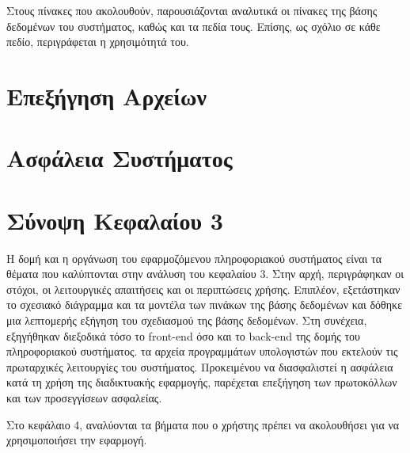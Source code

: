 Στους πίνακες που ακολουθούν, παρουσιάζονται αναλυτικά οι πίνακες της βάσης δεδομένων του συστήματος, καθώς και τα πεδία τους. Επίσης, ως σχόλιο σε κάθε πεδίο, περιγράφεται η χρησιμότητά του.

\FloatBarrier

\FloatBarrier

\section{Επεξήγηση Αρχείων}

\section{Ασφάλεια Συστήματος}

\section{Σύνοψη Κεφαλαίου 3}
Η δομή και η οργάνωση του εφαρμοζόμενου πληροφοριακού συστήματος είναι τα θέματα που καλύπτονται στην ανάλυση του κεφαλαίου 3. Στην αρχή, περιγράφηκαν οι στόχοι, οι λειτουργικές απαιτήσεις και οι περιπτώσεις χρήσης. Επιπλέον, εξετάστηκαν το σχεσιακό διάγραμμα και τα μοντέλα των πινάκων της βάσης δεδομένων και δόθηκε μια λεπτομερής εξήγηση του σχεδιασμού της βάσης δεδομένων. Στη συνέχεια, εξηγήθηκαν διεξοδικά τόσο το front-end όσο και το back-end της δομής του πληροφοριακού συστήματος. τα αρχεία προγραμμάτων υπολογιστών που εκτελούν τις πρωταρχικές λειτουργίες του συστήματος. Προκειμένου να διασφαλιστεί η ασφάλεια κατά τη χρήση της διαδικτυακής εφαρμογής, παρέχεται επεξήγηση των πρωτοκόλλων και των προσεγγίσεων ασφαλείας.

Στο κεφάλαιο 4, αναλύονται τα βήματα που ο χρήστης πρέπει να ακολουθήσει για να χρησιμοποιήσει την εφαρμογή.
